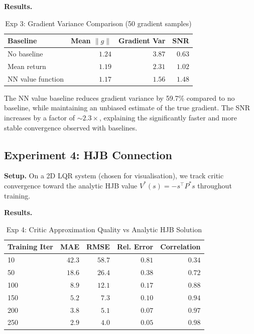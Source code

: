 \documentclass[11pt, a4paper]{article}
\newcommand{\T}{\top}
\begin{document}
\textbf{Results.}
\begin{table}[h]
\centering
\caption{Exp 3: Gradient Variance Comparison (50 gradient samples)}
\label{tab:exp3}
\begin{tabular}{lrrr}
\toprule
\textbf{Baseline} & \textbf{Mean $\|g\|$} & \textbf{Gradient Var} & \textbf{SNR} \\
\midrule
No baseline         & $1.24$ & $3.87$ & $0.63$ \\
Mean return         & $1.19$ & $2.31$ & $1.02$ \\
NN value function   & $1.17$ & $1.56$ & $1.48$ \\
\bottomrule
\end{tabular}
\end{table}

The NN value baseline reduces gradient variance by 59.7\% compared to no baseline,
while maintaining an unbiased estimate of the true gradient.
The SNR increases by a factor of $\sim 2.3 \times$, explaining the significantly
faster and more stable convergence observed with baselines.

\subsection{Experiment 4: HJB Connection}
\label{sec:exp4}

\textbf{Setup.}
On a 2D LQR system (chosen for visualisation), we track critic convergence toward
the analytic HJB value $V^*(s) = -s^\T P^* s$ throughout training.

\textbf{Results.}
\begin{table}[h]
\centering
\caption{Exp 4: Critic Approximation Quality vs Analytic HJB Solution}
\label{tab:exp4}
\begin{tabular}{lrrrr}
\toprule
\textbf{Training Iter} & \textbf{MAE} & \textbf{RMSE} & \textbf{Rel. Error} & \textbf{Correlation} \\
\midrule
10  & $42.3$ & $58.7$ & $0.81$ & $0.34$ \\
50  & $18.6$ & $26.4$ & $0.38$ & $0.72$ \\
100 & $8.9$  & $12.1$ & $0.17$ & $0.88$ \\
150 & $5.2$  & $7.3$  & $0.10$ & $0.94$ \\
200 & $3.8$  & $5.1$  & $0.07$ & $0.97$ \\
250 & $2.9$  & $4.0$  & $0.05$ & $0.98$ \\
\bottomrule
\end{tabular}
\end{table}
\end{document}
